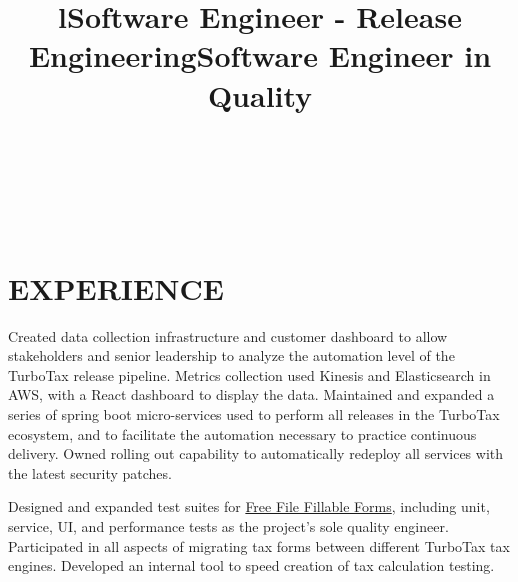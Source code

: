 \documentclass[margin]{res}
\begin{document}
\begin{resume}



\begin{format}
\title{l}\\
\\
\body\\
\end{format}

\section{EXPERIENCE}

\title{\textbf{Software Engineer - Release Engineering}}
\begin{position}
Created data collection infrastructure and customer dashboard to allow stakeholders and senior leadership to analyze the automation level of the TurboTax release pipeline. Metrics collection used Kinesis and Elasticsearch in AWS, with a React dashboard to display the data. Maintained and expanded a series of spring boot micro-services used to perform all releases in the TurboTax ecosystem, and to facilitate the automation necessary to practice continuous delivery. Owned rolling out capability to automatically redeploy all services with the latest security patches.
\end{position}

\title{\textbf{Software Engineer in Quality}}
\begin{position}
Designed and expanded test suites for \href{https://www.FreeFileFillableForms.com}{Free File Fillable Forms}, including unit, service, UI, and performance tests as the project's sole quality engineer. Participated in all aspects of migrating tax forms between different TurboTax tax engines. Developed an internal tool to speed creation of tax calculation testing.
\end{position}


\end{resume}
\end{document}
